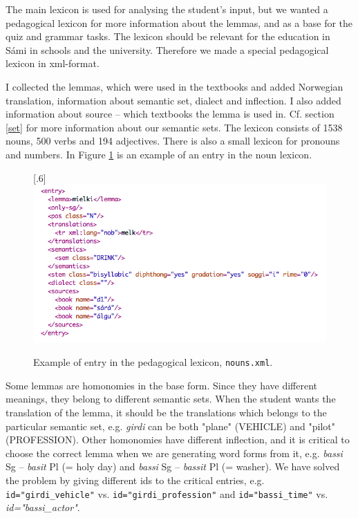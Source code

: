 \documentclass[a4paper,12pt]{article}
\begin{document}
The main lexicon is used for analysing the student's input, but we wanted a pedagogical lexicon for more information about the lemmas, and as a base for the quiz and grammar tasks. The lexicon should be relevant for the education in Sámi in schools and the university. Therefore we made a special pedagogical lexicon in xml-format. 

I collected the lemmas, which were used in the textbooks and added Norwegian translation, information about semantic set, dialect and inflection. I also added information about source -- which textbooks the lemma is used in. Cf. section \ref{set} for more information about our semantic sets. The lexicon consists of 1538 nouns, 500 verbs and 194 adjectives. There is also a small lexicon for pronouns and numbers. In Figure \ref{nounlex} is an example of an entry in the noun lexicon. \\


\begin{figure}[htbp]
\begin{center}
\scalebox{.6}[.6]{\includegraphics{img/nounlexicon.png}}\\
\caption{Example of entry in the pedagogical lexicon, \texttt{nouns.xml}.}
\label{nounlex}
\end{center}
\end{figure}

Some lemmas are homonomies in the base form. Since they have different meanings, they belong to different semantic sets. When the student wants the translation of the lemma, it should be the translations which belongs to the particular semantic set, e.g. \textit{girdi} can be both "plane" (VEHICLE) and "pilot" (PROFESSION). Other homonomies have different inflection, and it is critical to choose the correct lemma when we are generating word forms from it, e.g. \textit{bassi} Sg -- \textit{basit} Pl (= holy day) and \textit{bassi} Sg -- \textit{bassit} Pl (= washer). We have solved the problem by giving different ids to the critical entries, e.g. \texttt{id="girdi\_vehicle"} vs. 
\texttt{id="girdi\_profession"} and \texttt{id="bassi\_time"} vs. \textit{id="bassi\_actor"}.
\end{document}
